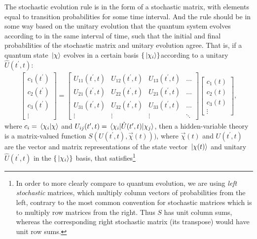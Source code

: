 The stochastic evolution rule is in the form of a stochastic matrix, with elements equal to transition probabilities for some time interval. And the rule should be in some way based on the unitary evolution that the quantum system evolves according to in the same interval of time, such that the initial and final probabilities of the stochastic matrix and unitary evolution agree. That is, if a quantum state $\ket\chi$ evolves in a certain basis $\{\ket{\chi_i}\}$according to a unitary $\hat U(t^\prime, t)$:
\begin{align}
\left[\begin{matrix}
c_1(t^\prime)\\c_2(t^\prime)\\c_3(t^\prime)\\\vdots
\end{matrix}\right]
= \left[\begin{matrix}
U_{11}(t^\prime, t) & U_{12}(t^\prime, t) & U_{13}(t^\prime, t)&\hdots\\
U_{21}(t^\prime, t) & U_{22}(t^\prime, t) & U_{23}(t^\prime, t)&\hdots\\
U_{31}(t^\prime, t) & U_{32}(t^\prime, t) & U_{33}(t^\prime, t)&\hdots\\
\vdots & \vdots & \vdots & \ddots
\end{matrix}\right]
\left[\begin{matrix}
c_1(t)\\c_2(t)\\c_3(t)\\\vdots
\end{matrix}\right],
\end{align}
where $c_i = \braket{\chi_i}{\chi}$ and $U_{ij}(t^\prime, t) = \matrixel{\chi_i}{\hat U(t^\prime, t)}{\chi_j}$, then a hidden-variable theory is a matrix-valued function $S(U(t^\prime, t), \vec\chi(t)))$, where $\vec\chi(t)$ and $U(t^\prime, t)$ are the vector and matrix representations of the state vector $\ket{\chi(t)}$ and unitary $\hat U(t^\prime, t)$ in the $\{\ket{\chi_i}\}$ basis, that satisfies\footnote{In order to more clearly compare to quantum evolution, we are using \emph{left stochastic} matrices, which multiply column vectors of probabilities from the left, contrary to the most common convention for stochastic matrices which is to multiply row matrices from the right. Thus $S$ has unit column sums, whereas the corresponding right stochastic matrix (its transpose) would have unit row sums.}
